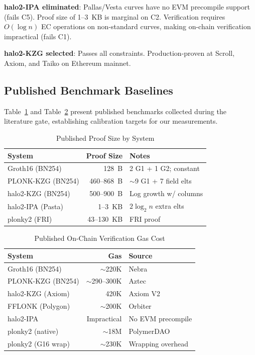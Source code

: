 \textbf{halo2-IPA eliminated}: Pallas/Vesta curves have no EVM
precompile support (fails C5). Proof size of 1--3~KB is marginal
on C2. Verification requires $O(\log n)$ EC operations on
non-standard curves, making on-chain verification impractical
(fails C1).

\textbf{halo2-KZG selected}: Passes all constraints. Production-proven
at Scroll, Axiom, and Taiko on Ethereum mainnet.

\subsection{Published Benchmark Baselines}

Table~\ref{tab:published-proof} and Table~\ref{tab:published-gas}
present published benchmarks collected during the literature gate,
establishing calibration targets for our measurements.

\begin{table}[htbp]
\caption{Published Proof Size by System}
\label{tab:published-proof}
\centering
\begin{tabular}{@{}lrl@{}}
\toprule
\textbf{System} & \textbf{Proof Size} & \textbf{Notes} \\
\midrule
Groth16 (BN254) & 128~B & 2 G1 + 1 G2; constant \\
PLONK-KZG (BN254) & 460--868~B & $\sim$9 G1 + 7 field elts \\
halo2-KZG (BN254) & 500--900~B & Log growth w/ columns \\
halo2-IPA (Pasta) & 1--3~KB & $2\log_2 n$ extra elts \\
plonky2 (FRI) & 43--130~KB & FRI proof \\
\bottomrule
\end{tabular}
\end{table}

\begin{table}[htbp]
\caption{Published On-Chain Verification Gas Cost}
\label{tab:published-gas}
\centering
\begin{tabular}{@{}lrl@{}}
\toprule
\textbf{System} & \textbf{Gas} & \textbf{Source} \\
\midrule
Groth16 (BN254) & $\sim$220K & Nebra~\cite{nebra-gas} \\
PLONK-KZG (BN254) & $\sim$290--300K & Aztec~\cite{aztec-bench} \\
halo2-KZG (Axiom) & 420K & Axiom V2~\cite{axiom} \\
FFLONK (Polygon) & $\sim$200K & Orbiter~\cite{orbiter-gas} \\
halo2-IPA & Impractical & No EVM precompile \\
plonky2 (native) & $\sim$18M & PolymerDAO \\
plonky2 (G16 wrap) & $\sim$230K & Wrapping overhead \\
\bottomrule
\end{tabular}
\end{table}

